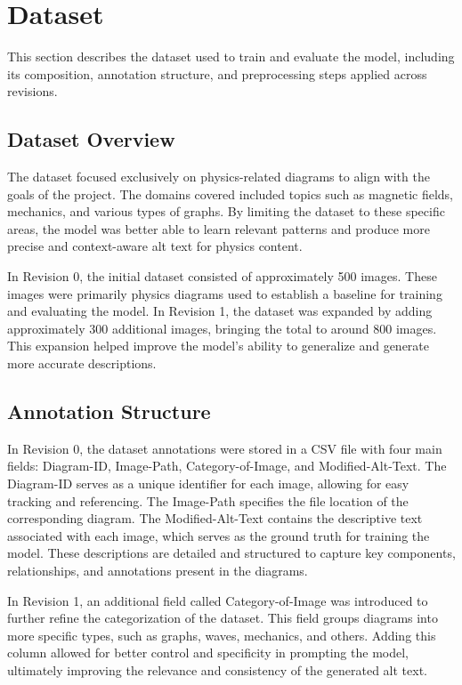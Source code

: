\documentclass[11pt]{article}
\begin{document}
\section{Dataset}

This section describes the dataset used to train and evaluate the model, including its composition, annotation structure, and preprocessing steps applied across revisions.

\subsection{Dataset Overview}

The dataset focused exclusively on physics-related diagrams to align with the goals of the project. The domains covered included topics such as magnetic fields, mechanics, and various types of graphs. By limiting the dataset to 
these specific areas, the model was better able to learn relevant patterns and produce more precise and context-aware alt text for physics content.

In Revision 0, the initial dataset consisted of approximately 500 images. These images were primarily physics diagrams used to establish a baseline for training and evaluating the model. In Revision 1, the dataset was expanded 
by adding approximately 300 additional images, bringing the total to around 800 images. This expansion helped improve the model's ability to generalize and generate more accurate descriptions.

\subsection{Annotation Structure}
In Revision 0, the dataset annotations were stored in a CSV file with four main fields: Diagram-ID, Image-Path, Category-of-Image, and Modified-Alt-Text. The Diagram-ID serves as 
a unique identifier for each image, allowing for easy tracking and referencing. The Image-Path specifies the file location of the corresponding diagram. The Modified-Alt-Text contains 
the descriptive text associated with each image, 
which serves as the ground truth for training the model. These descriptions are detailed and structured to capture key components, relationships, and annotations present in the diagrams.

In Revision 1, an additional field called Category-of-Image was introduced to further refine the categorization of the dataset. This field groups diagrams into more specific types, such as graphs, 
waves, mechanics, and others. Adding this column allowed for better control and specificity in prompting the model, ultimately improving the relevance and consistency of the generated alt text.
\end{document}
